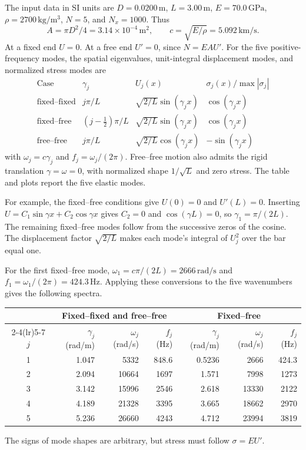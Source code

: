 The input data in SI units are \(D=0.0200\,\mathrm{m}\), \(L=3.00\,\mathrm{m}\), \(E=70.0\,\mathrm{GPa}\), \(\rho=2700\,\mathrm{kg/m^3}\), \(N=5\), and \(N_x=1000\). Thus
\[
A=\pi D^2/4=3.14\times10^{-4}\,\mathrm{m^2},\qquad
c=\sqrt{E/\rho}=5.092\,\mathrm{km/s}.
\]
At a fixed end \(U=0\). At a free end \(U'=0\), since \(N=EAU'\). For the five positive-frequency modes, the spatial eigenvalues, unit-integral displacement modes, and normalized stress modes are
\[
\begin{array}{llll}
\text{Case}&\gamma_j&U_j(x)&\sigma_j(x)/\max|\sigma_j|\\
\text{fixed--fixed}&j\pi/L&\sqrt{2/L}\sin(\gamma_j x)&\cos(\gamma_j x)\\
\text{fixed--free}&(j-\tfrac12)\pi/L&\sqrt{2/L}\sin(\gamma_j x)&\cos(\gamma_j x)\\
\text{free--free}&j\pi/L&\sqrt{2/L}\cos(\gamma_j x)&-\sin(\gamma_j x)
\end{array}
\]
with \(\omega_j=c\gamma_j\) and \(f_j=\omega_j/(2\pi)\). Free--free motion also admits the rigid translation \(\gamma=\omega=0\), with normalized shape \(1/\sqrt L\) and zero stress. The table and plots report the five elastic modes.

For example, the fixed--free conditions give \(U(0)=0\) and \(U'(L)=0\). Inserting \(U=C_1\sin\gamma x+C_2\cos\gamma x\) gives \(C_2=0\) and \(\cos(\gamma L)=0\), so \(\gamma_1=\pi/(2L)\). The remaining fixed--free modes follow from the successive zeros of the cosine. The displacement factor \(\sqrt{2/L}\) makes each mode's integral of \(U_j^2\) over the bar equal one.

For the first fixed--free mode, $\omega_1=c\pi/(2L)=2666\,\mathrm{rad/s}$ and $f_1=\omega_1/(2\pi)=424.3\,\mathrm{Hz}$. Applying these conversions to the five wavenumbers gives the following spectra.
\begin{center}\small
\begin{tabular}{@{}crrrrrr@{}}\toprule
 & \multicolumn{3}{c}{Fixed--fixed and free--free} & \multicolumn{3}{c}{Fixed--free}\\
\cmidrule(lr){2-4}\cmidrule(lr){5-7}
$j$ & $\gamma_j$ (rad/m) & $\omega_j$ (rad/s) & $f_j$ (Hz) & $\gamma_j$ (rad/m) & $\omega_j$ (rad/s) & $f_j$ (Hz)\\\midrule
1 & 1.047 & 5332 & 848.6 & 0.5236 & 2666 & 424.3\\
2 & 2.094 & 10664 & 1697 & 1.571 & 7998 & 1273\\
3 & 3.142 & 15996 & 2546 & 2.618 & 13330 & 2122\\
4 & 4.189 & 21328 & 3395 & 3.665 & 18662 & 2970\\
5 & 5.236 & 26660 & 4243 & 4.712 & 23994 & 3819\\\bottomrule
\end{tabular}
\end{center}
The signs of mode shapes are arbitrary, but stress must follow \(\sigma=EU'\).

